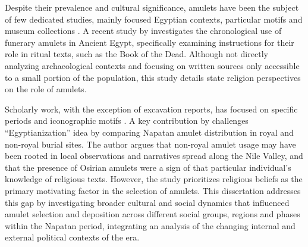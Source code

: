 Despite their prevalence and cultural significance, amulets have been the subject of few dedicated studies, mainly focused Egyptian contexts, particular motifs and museum collections \parencites{petrieAmulets1914, müller-winklerÄgyptischenObjektAmuletteMit1987, andrewsAmuletsAncientEgypt1994, herrmannÄgyptischeAmuletteAus1994, herrmannÄgyptischenAmuletteSammlungen2003, dubielAmuletteSiegelUnd2008, herrmann1001AmulettAltägyptischer2010, connorAmuletiDellAnticoEgitto2017, muñozpérezAllThatGlisters2018, muñozpérezAmulettesFunérairesÉgyptiennes2021, muñozpérezBúsquedaVidaEterna2021, hardwickLéventailCroyancesAmulettes2019, herrerínAnálisisPreliminarMomias2019, kalloniatisAmulets2019, lenzoFormulePourLamulette2019, arroyoPapelDosAmuletos2020, arroyoUsoAmuletosComo2021, donnatGestesRituelsAutour2020, donnatProposQuelquesAspects2021, mekisHypocephalusAncientEgyptian2020, quackBemerkungenAmulettpapyrusPBM2020, quackSprücheFürPerle2023, györyEmergenceBesAmulets2024}. A recent study by \textcite{quackAltägyptischeAmuletteUnd2022} investigates the chronological use of funerary amulets in Ancient Egypt, specifically examining instructions for their role in ritual texts, such as the Book of the Dead. Although not directly analyzing archaeological contexts and focusing on written sources only accessible to a small portion of the population, this study details state religion perspectives on the role of amulets.


Scholarly work, with the exception of excavation reports, has focused on specific periods and iconographic motifs \parencites{balandaNapatanFuneraryAmulets2015, balandaProtectingMummyReinterpretation2014, ditriaUnderstandingKermaAmulets2021, ditriaAmuletsKermaCulture2022, lemosForeignObjectsLocal2020, sackho-autissierQuelquesAmulettesNapatéennes2004}. A key contribution by \textcite[p.~39-52]{balandaDevelopmentRoyalFunerary2020} challenges “Egyptianization” idea by comparing Napatan amulet distribution in royal and non-royal burial sites. The author argues that non-royal amulet usage may have been rooted in local observations and narratives spread along the Nile Valley, and that the presence of Osirian amulets were a sign of that particular individual’s knowledge of religious texts. However, the study prioritizes religious beliefs as the primary motivating factor in the selection of amulets. This dissertation addresses this gap by investigating broader cultural and social dynamics that influenced amulet selection and deposition across different social groups, regions and phases within the Napatan period, integrating an analysis of the changing internal and external political contexts of the era.


